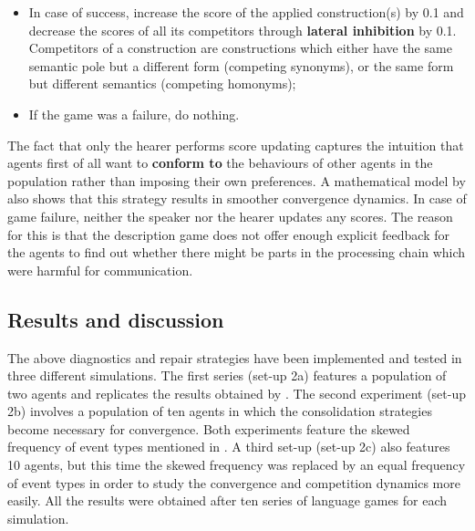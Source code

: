 \begin{itemize}
\item In case of success, increase the score of the applied construction(s) by 0.1 and decrease the scores of all its competitors through {\bfseries lateral inhibition} by 0.1. Competitors of a construction are constructions which either have the same semantic pole but a different form (competing synonyms), or the same form but different semantics (competing homonyms);
\item If the game was a failure, do nothing.
\end{itemize}

The fact that only the hearer performs score updating captures the intuition that agents first of all want to {\bfseries conform to} the behaviours of other agents in the population rather than imposing their own preferences. A mathematical model by \citet{devylder07evolution} also shows that this strategy results in smoother convergence dynamics. In case of game failure, neither the speaker nor the hearer updates any scores. The reason for this is that the description game does not offer enough explicit feedback for the agents to find out whether there might be parts in the processing chain which were harmful for communication.

\subsection{Results and discussion}

The above diagnostics and repair strategies have been implemented and tested in three different simulations. The first series (set-up 2a) features a population of two agents and replicates the results obtained by \citet{steels02simulating, steels04constructivist}. The second experiment (set-up 2b) involves a population of ten agents in which the consolidation strategies become necessary for convergence. Both experiments feature the skewed frequency of event types mentioned in . A third set-up (set-up 2c) also features 10 agents, but this time the skewed frequency was replaced by an equal frequency of event types in order to study the convergence and competition dynamics more easily. All the results were obtained after ten series of language games for each simulation.


